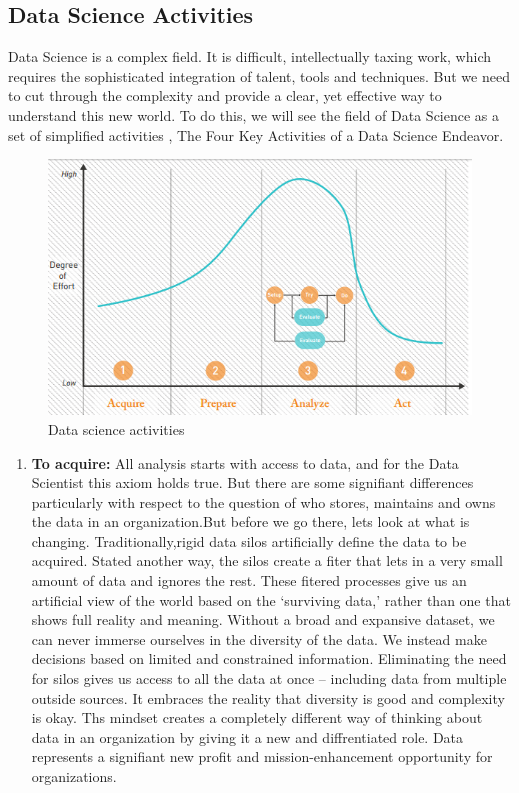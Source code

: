 \documentclass[a4paper,12pt,oneside]{report}
\begin{document}
\subsection{Data Science Activities }
{Data Science is a complex field. It is difficult, intellectually taxing work, which requires the sophisticated integration of talent, tools and techniques. But we need to cut through the complexity and provide a clear, yet effective way to understand this new world. To do this, we will see the field of Data Science as a set of simplified activities , The Four Key Activities of a Data Science Endeavor.
\begin{figure}[ht]
\centering
\includegraphics[width=1\textwidth]{"Data science activities"}
\caption{Data science activities}
\end{figure}
\begin{enumerate}
\item \textbf {To acquire:} {All analysis starts with access to data, and for the Data Scientist this axiom holds true. But there are some signifiant differences particularly with respect to the question of who stores, maintains and
owns the data in an organization.But before we go there, lets look at what is changing. Traditionally,rigid data silos artificially define the data to be acquired. Stated another way, the silos create a fiter that lets in a very small amount of
data and ignores the rest. These fitered processes give us an artificial view of the world based on the ‘surviving data,’ rather than one that shows full reality and meaning. Without a broad and expansive dataset, we can never immerse ourselves in the diversity of the
data. We instead make decisions based on limited and constrained information. Eliminating the need for silos gives us access to all the data at once – including data from multiple outside sources. It embraces the reality that diversity is good and complexity is okay. Ths mindset creates a completely different way of thinking about data in an organization by giving it a new and diffrentiated role. Data represents a signifiant new profit and mission-enhancement opportunity for organizations.\\
}
\end{enumerate}}
\end{document}
